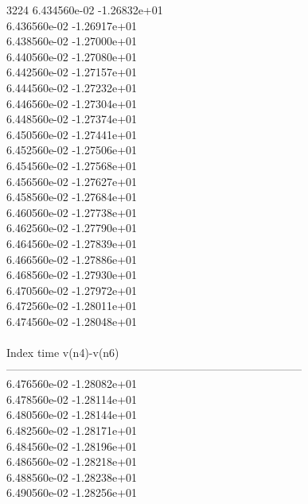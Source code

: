 3224	6.434560e-02	-1.26832e+01	\\ 	6.436560e-02	-1.26917e+01	\\ 	6.438560e-02	-1.27000e+01	\\ 	6.440560e-02	-1.27080e+01	\\ 	6.442560e-02	-1.27157e+01	\\ 	6.444560e-02	-1.27232e+01	\\ 	6.446560e-02	-1.27304e+01	\\ 	6.448560e-02	-1.27374e+01	\\ 	6.450560e-02	-1.27441e+01	\\ 	6.452560e-02	-1.27506e+01	\\ 	6.454560e-02	-1.27568e+01	\\ 	6.456560e-02	-1.27627e+01	\\ 	6.458560e-02	-1.27684e+01	\\ 	6.460560e-02	-1.27738e+01	\\ 	6.462560e-02	-1.27790e+01	\\ 	6.464560e-02	-1.27839e+01	\\ 	6.466560e-02	-1.27886e+01	\\ 	6.468560e-02	-1.27930e+01	\\ 	6.470560e-02	-1.27972e+01	\\ 	6.472560e-02	-1.28011e+01	\\ 	6.474560e-02	-1.28048e+01	\\ \hline
\\ \hline
Index   time            v(n4)-v(n6)     \\ \hline
--------------------------------------------------------------------------------\\ 	6.476560e-02	-1.28082e+01	\\ 	6.478560e-02	-1.28114e+01	\\ 	6.480560e-02	-1.28144e+01	\\ 	6.482560e-02	-1.28171e+01	\\ 	6.484560e-02	-1.28196e+01	\\ 	6.486560e-02	-1.28218e+01	\\ 	6.488560e-02	-1.28238e+01	\\ 	6.490560e-02	-1.28256e+01	\\ \hline
